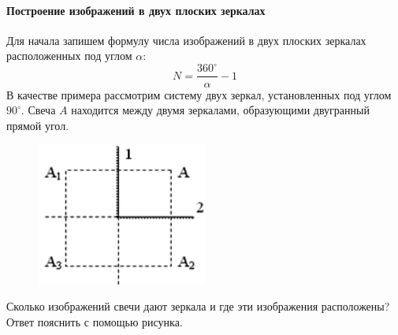 \documentclass[11pt]{article}
\begin{document}
\begin{enumerate}
			\paragraph{Построение изображений в двух плоских зеркалах}
			Для начала запишем формулу числа изображений в двух плоских зеркалах расположенных под углом $\alpha$:
			$$
				N = \frac{360^\circ}{\alpha} - 1
			$$
			В качестве примера рассмотрим систему двух зеркал, установленных под углом $90^\circ$.
			Свеча $A$ находится между двумя зеркалами, образующими двугранный прямой угол.
			\begin{figure}[!ht]
				\centering
				\includegraphics[width=0.5\textwidth]{assets/mirrors/two_mirrors1.png}
			\end{figure}

			Сколько изображений свечи дают зеркала и где эти изображения расположены? Ответ пояснить с помощью рисунка.


\end{enumerate}
\end{document}
